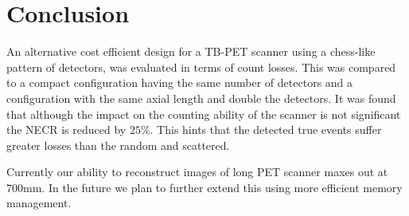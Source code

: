 \documentclass{IEEEtran}
\begin{document}
\vspace{-0.2cm}

\section{Conclusion}
An alternative cost efficient design for a TB-PET scanner using a chess-like pattern of detectors, was evaluated in terms of count losses. This was compared to a compact configuration having the same number of detectors and a configuration with the same axial length and double the detectors. It was found that although the impact on the counting ability of the scanner is not significant the NECR is reduced by $25\%$. This hints that the detected true events suffer greater losses than the random and scattered. 

Currently our ability to reconstruct images of long PET scanner maxes out at $700$mm. In the future we plan to further extend this using more efficient memory management. 

\vspace{-0.2cm}
\AtNextBibliography{\footnotesize}
\printbibliography
\vspace{-0.2cm}
\end{document}
